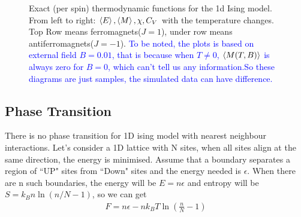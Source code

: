 \documentclass[12pt]{article}
\begin{document}
\begin{figure}[htb]
		 \quad
		\caption{Exact (per spin) thermodynamic functions for the 1d Ising model. From left to right: $\braket{E},\braket{M},\chi,C_V$ with the temperature changes. Top Row means ferromagnets($J=1$), under row means antiferromagnets($J=-1$). \textcolor{blue}{To be noted, the plots is based on external field $B=0.01$, that is because when $T\neq0$, $\braket{M(T,B)}$ is always zero for $B=0$,  which can't tell us any information.So these diagrams are just samples, the simulated data can have difference.}}
		\label{fig: analytic solution as temperature}
	\end{figure}
	
	\subsection{Phase Transition}
	\label{sec: phase transition}
	There is no phase transition for 1D ising model with nearest neighbour interactions. Let's consider a 1D lattice with N sites, when all sites align at the same direction, the energy is minimised. Assume that a boundary separates a region of ``UP" sites from ``Down" sites and the energy needed is $\epsilon$. When there are n such boundaries, the energy will be $E=n \epsilon$ and entropy will be $S=k_B n \ln(n/N-1)$, so we can get 
	\begin{align}
		F=n\epsilon - nk_B T \ln(\frac{n}{N}-1)
	\end{align}
	
\end{document}

